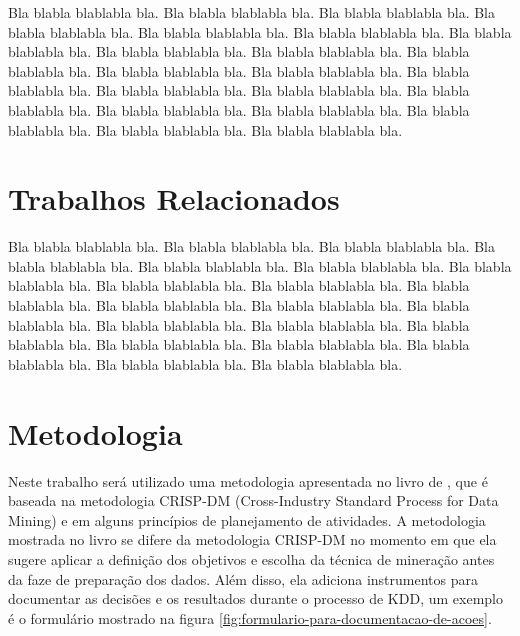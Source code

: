 \documentclass[diss,capa]{texufpel}
\begin{document}
  Bla blabla blablabla bla.  Bla blabla blablabla bla.  Bla blabla
  blablabla bla.  Bla blabla blablabla bla.  Bla blabla blablabla bla.
  Bla blabla blablabla bla.  Bla blabla blablabla bla.  Bla blabla
  blablabla bla.  Bla blabla blablabla bla.  Bla blabla blablabla bla.
  Bla blabla blablabla bla.  Bla blabla blablabla bla.  Bla blabla
  blablabla bla.  Bla blabla blablabla bla.  Bla blabla blablabla bla.
  Bla blabla blablabla bla.  Bla blabla blablabla bla.  Bla blabla
  blablabla bla.  Bla blabla blablabla bla.  Bla blabla blablabla bla.
  Bla blabla blablabla bla.


\chapter{Trabalhos Relacionados}

  Bla blabla blablabla bla.  Bla blabla blablabla bla.  Bla blabla
  blablabla bla.  Bla blabla blablabla bla.  Bla blabla blablabla bla.
  Bla blabla blablabla bla.  Bla blabla blablabla bla.  Bla blabla
  blablabla bla.  Bla blabla blablabla bla.  Bla blabla blablabla bla.
  Bla blabla blablabla bla.  Bla blabla blablabla bla.  Bla blabla
  blablabla bla.  Bla blabla blablabla bla.  Bla blabla blablabla bla.
  Bla blabla blablabla bla.  Bla blabla blablabla bla.  Bla blabla
  blablabla bla.  Bla blabla blablabla bla.  Bla blabla blablabla bla.
  Bla blabla blablabla bla.

\chapter{Metodologia}

Neste trabalho será utilizado uma metodologia apresentada no livro de \citet{goldschmidt2015data}, que é baseada na metodologia CRISP-DM (Cross-Industry Standard Process for Data Mining) e em alguns princípios de planejamento de atividades. A metodologia mostrada no livro se difere da metodologia CRISP-DM no momento em que ela sugere aplicar a definição dos objetivos e escolha da técnica de mineração antes da faze de preparação dos dados. Além disso, ela adiciona instrumentos para documentar as decisões e os resultados durante o processo de KDD, um exemplo é o formulário mostrado na figura \ref{fig:formulario-para-documentacao-de-acoes}.
\end{document}
